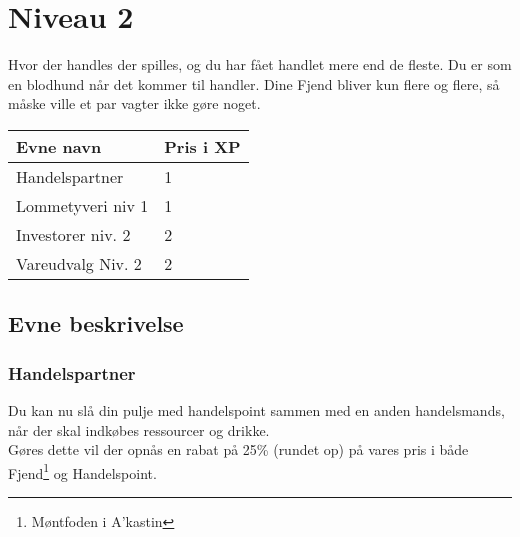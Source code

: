 \chapter*{Niveau 2}
Hvor der handles der spilles, og du har fået handlet mere end de fleste. Du er som en blodhund når det kommer til handler. Dine Fjend bliver kun flere og flere, så måske ville et par vagter ikke gøre noget.

\begin{table}[H]
    \centering
    \begin{tabular}{|p{}|p{}|}
    \rowcolor{cerulean!80}\hline
        Evne navn & Pris i XP \\\hline
         Handelspartner & 1 \\\hline
         Lommetyveri niv 1 & 1\\\hline
         Investorer niv. 2 & 2 \\\hline
         Vareudvalg Niv. 2 & 2 \\\hline
    \end{tabular}
\end{table}
\section*{Evne beskrivelse}

\subsection*{Handelspartner}
Du kan nu slå din pulje med handelspoint sammen med en anden handelsmands, når der skal indkøbes ressourcer og drikke.\\
Gøres dette vil der opnås en rabat på 25\% (rundet op) på vares pris i både Fjend\footnote{Møntfoden i A'kastin} og Handelspoint.






